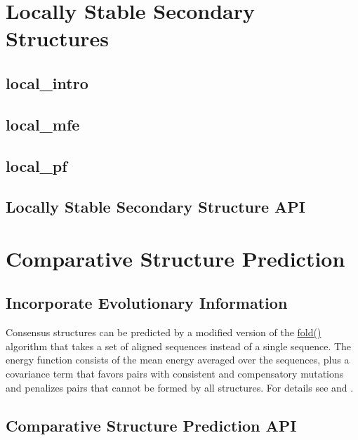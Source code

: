  \hypertarget{local_vs_global}{}\section{Locally Stable Secondary Structures}\label{local_vs_global}
\hypertarget{local_vs_global_local_intro}{}\subsection{local\+\_\+intro}\label{local_vs_global_local_intro}
\hypertarget{local_vs_global_local_mfe}{}\subsection{local\+\_\+mfe}\label{local_vs_global_local_mfe}
\hypertarget{local_vs_global_local_pf}{}\subsection{local\+\_\+pf}\label{local_vs_global_local_pf}
\hypertarget{local_vs_global_local_api}{}\subsection{Locally Stable Secondary Structure A\+PI}\label{local_vs_global_local_api}
 \hypertarget{consensus_structures}{}\section{Comparative Structure Prediction}\label{consensus_structures}
\hypertarget{consensus_structures_consensus_structure_intro}{}\subsection{Incorporate Evolutionary Information}\label{consensus_structures_consensus_structure_intro}
Consensus structures can be predicted by a modified version of the \mbox{\hyperlink{group__mfe__fold__single_gaadafcb0f140795ae62e5ca027e335a9b}{fold()}} algorithm that takes a set of aligned sequences instead of a single sequence. The energy function consists of the mean energy averaged over the sequences, plus a covariance term that favors pairs with consistent and compensatory mutations and penalizes pairs that cannot be formed by all structures. For details see \cite{hofacker:2002} and \cite{bernhart:2008}.\hypertarget{consensus_structures_consensus_structure_api}{}\subsection{Comparative Structure Prediction A\+PI}\label{consensus_structures_consensus_structure_api}
